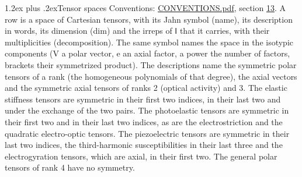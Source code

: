 \documentclass[10pt,a4paper]{article}
\makeatletter
\renewcommand\section{\@startsection{section}{1}{\z@}{-3ex plus -1ex minus -.2ex}%
  {1.2ex plus .2ex}{\normalfont\large\sffamily\bfseries\color{parttitle}}}
\numberwithin{equation}{section}
\newcommand{\grp}[1]{\mathsf{#1}}
\makeatother
\begin{document}
\section{Tensor spaces}\label{s:tensor_spaces}
Conventions: \href{../../CONVENTIONS.pdf}{CONVENTIONS.pdf}, section \href{../../CONVENTIONS.pdf\#conv.13}{13}.
\leavevmode\label{n:head.name}\label{n:head.description}\label{n:head.dim}\label{n:head.decomposition}A row is a space of Cartesian tensors, with its Jahn symbol (name), its description in words, its dimension (dim) and the irreps of $\grp{I}$ that it carries, with their multiplicities (decomposition). \label{n:label.jahn}The same symbol names the space in the isotypic components (V a polar vector, e an axial factor, a power the number of factors, brackets their symmetrized product). The descriptions name the symmetric polar tensors of a rank (the homogeneous polynomials of that degree), the axial vectors and the symmetric axial tensors of ranks 2 (optical activity) and 3. The elastic stiffness tensors are symmetric in their first two indices, in their last two and under the exchange of the two pairs. The photoelastic tensors are symmetric in their first two and in their last two indices, as are the electrostriction and the quadratic electro-optic tensors. The piezoelectric tensors are symmetric in their last two indices, the third-harmonic susceptibilities in their last three and the electrogyration tensors, which are axial, in their first two. The general polar tensors of rank 4 have no symmetry.
\end{document}

